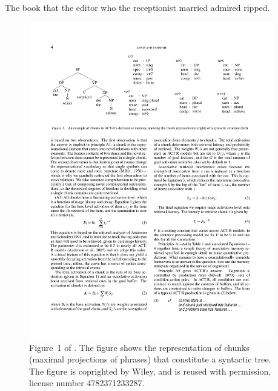 \documentclass{cambridge7A}\usepackage[]{graphicx}\usepackage[]{color}
\begin{document}
\begin{exe}
\ex \label{ex:centeremb}
The book that the editor who the receptionist married admired ripped.
\end{exe}  
%

\begin{figure}[htb]
	\centering
	\includegraphics[width=0.95\textwidth]{figures/lv05-fig1-structure}
	\caption{Figure~1 of \cite{LewisVasishth2005}. The figure shows the representation of chunks (maximal projections of phrases) that constitute a syntactic tree. The figure is coprighted by Wiley, and is reused with permission, license number 4782371233287.}
	\label{fig:lv05chunks}
\end{figure}
\end{document}
